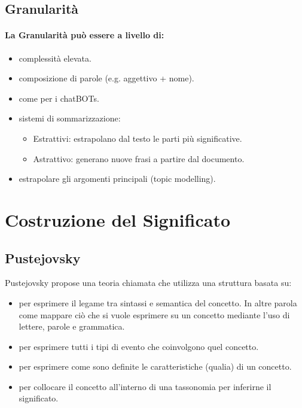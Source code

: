 \subsection{Granularità}

\paragraph{La Granularità può essere a livello di:}

\begin{itemize}
  \item {} complessità elevata. 
  \item {} composizione di parole (e.g. aggettivo + nome). 
  \item {} come per i chatBOTs. 
  \item {} sistemi di sommarizzazione:
    \begin{itemize}
      \item Estrattivi: estrapolano dal testo le parti più significative. 
      \item Astrattivo: generano nuove frasi a partire dal documento. 
    \end{itemize}
  \item {} estrapolare gli argomenti principali (topic modelling).
\end{itemize}

\section{Costruzione del Significato}

\subsection{Pustejovsky}

Pustejovsky propose una teoria chiamata  che utilizza una struttura basata su:

\begin{itemize}
  \item {} per esprimere il legame tra sintassi e semantica del concetto. In altre parola come mappare ciò che si vuole esprimere su un concetto mediante l'uso di lettere, parole e grammatica. 
  \item {} per esprimere tutti i tipi di evento che coinvolgono quel concetto. 
  \item {} per esprimere come sono definite le caratteristiche (qualia) di un concetto.
  \item {} per collocare il concetto all'interno di una tassonomia per inferirne il significato.
\end{itemize}

